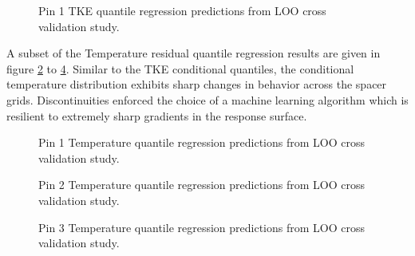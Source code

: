 \begin{figure}[H]%
    \centering
    \qquad
    \caption[Q-Q LOO TKE pin 3 results.]{Pin 1 TKE quantile regression predictions from LOO cross validation study.}%
    \label{fig:tkepin3}%
\end{figure}


A subset of the Temperature residual quantile regression results are given in figure \ref{fig:temppin1} to \ref{fig:temppin3}.  Similar to the TKE conditional quantiles, the conditional temperature distribution exhibits sharp changes in behavior across the spacer grids.  Discontinuities enforced the choice of a machine learning algorithm which is resilient to extremely sharp gradients in the response surface.

\begin{figure}[H]%
    \centering
    \qquad
    \caption[Q-Q LOO Temperature pin 1 results.]{Pin 1 Temperature quantile regression predictions from LOO cross validation study.}%
    \label{fig:temppin1}%
\end{figure}

\begin{figure}[H]%
    \centering
    \qquad
    \caption[Q-Q LOO Temperature pin 2 results.]{Pin 2 Temperature quantile regression predictions from LOO cross validation study.}%
    \label{fig:temppin2}%
\end{figure}

\begin{figure}[H]%
    \centering
    \qquad
    \caption[Q-Q LOO Temperature pin 3 results.]{Pin 3 Temperature quantile regression predictions from LOO cross validation study.}%
    \label{fig:temppin3}%
\end{figure}

